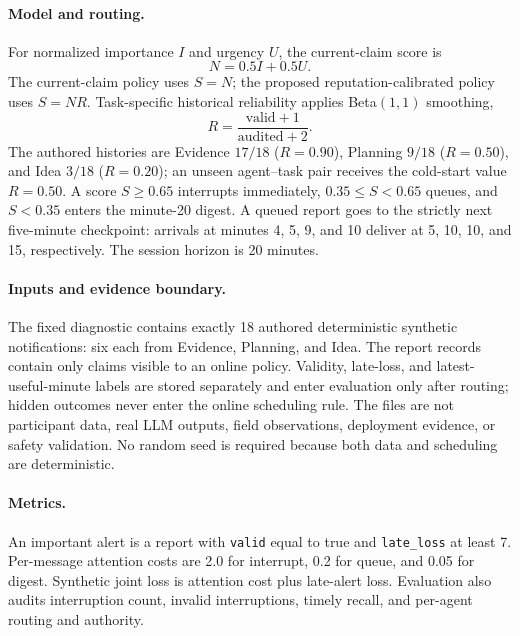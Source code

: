 \paragraph{Model and routing.}
For normalized importance $I$ and urgency $U$, the current-claim score is
\[
N=0.5I+0.5U.
\]
The current-claim policy uses $S=N$; the proposed reputation-calibrated policy uses $S=NR$. Task-specific historical reliability applies Beta$(1,1)$ smoothing,
\[
R=\frac{\text{valid}+1}{\text{audited}+2}.
\]
The authored histories are Evidence $17/18$ ($R=0.90$), Planning $9/18$ ($R=0.50$), and Idea $3/18$ ($R=0.20$); an unseen agent--task pair receives the cold-start value $R=0.50$. A score $S\geq0.65$ interrupts immediately, $0.35\leq S<0.65$ queues, and $S<0.35$ enters the minute-20 digest. A queued report goes to the strictly next five-minute checkpoint: arrivals at minutes 4, 5, 9, and 10 deliver at 5, 10, 10, and 15, respectively. The session horizon is 20 minutes.

\paragraph{Inputs and evidence boundary.}
The fixed diagnostic contains exactly 18 authored deterministic synthetic notifications: six each from Evidence, Planning, and Idea. The report records contain only claims visible to an online policy. Validity, late-loss, and latest-useful-minute labels are stored separately and enter evaluation only after routing; hidden outcomes never enter the online scheduling rule. The files are not participant data, real LLM outputs, field observations, deployment evidence, or safety validation. No random seed is required because both data and scheduling are deterministic.

\paragraph{Metrics.}
An important alert is a report with \texttt{valid} equal to true and \texttt{late\_loss} at least 7. Per-message attention costs are 2.0 for interrupt, 0.2 for queue, and 0.05 for digest. Synthetic joint loss is attention cost plus late-alert loss. Evaluation also audits interruption count, invalid interruptions, timely recall, and per-agent routing and authority.

